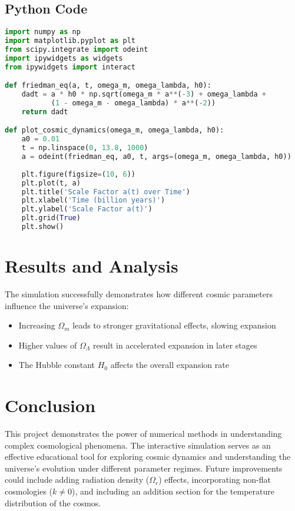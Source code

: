\documentclass{article}
\begin{document}
\subsection{Python Code}
\begin{lstlisting}[language=Python]
import numpy as np
import matplotlib.pyplot as plt
from scipy.integrate import odeint
import ipywidgets as widgets
from ipywidgets import interact

def friedman_eq(a, t, omega_m, omega_lambda, h0):
    dadt = a * h0 * np.sqrt(omega_m * a**(-3) + omega_lambda + 
           (1 - omega_m - omega_lambda) * a**(-2))
    return dadt

def plot_cosmic_dynamics(omega_m, omega_lambda, h0):
    a0 = 0.01
    t = np.linspace(0, 13.8, 1000)
    a = odeint(friedman_eq, a0, t, args=(omega_m, omega_lambda, h0))
    
    plt.figure(figsize=(10, 6))
    plt.plot(t, a)
    plt.title('Scale Factor a(t) over Time')
    plt.xlabel('Time (billion years)')
    plt.ylabel('Scale Factor a(t)')
    plt.grid(True)
    plt.show()
\end{lstlisting}

\section{Results and Analysis}
The simulation successfully demonstrates how different cosmic parameters influence the universe's expansion:

\begin{itemize}
\item Increasing $\Omega_m$ leads to stronger gravitational effects, slowing expansion
\item Higher values of $\Omega_\Lambda$ result in accelerated expansion in later stages
\item The Hubble constant $H_0$ affects the overall expansion rate
\end{itemize}

\section{Conclusion}
This project demonstrates the power of numerical methods in understanding complex cosmological phenomena. The interactive simulation serves as an effective educational tool for exploring cosmic dynamics and understanding the universe's evolution under different parameter regimes. Future improvements could include adding radiation density ($\Omega_r$) effects, incorporating non-flat cosmologies ($k \neq 0$), and including an addition section for the temperature distribution of the cosmos.
\end{document}
